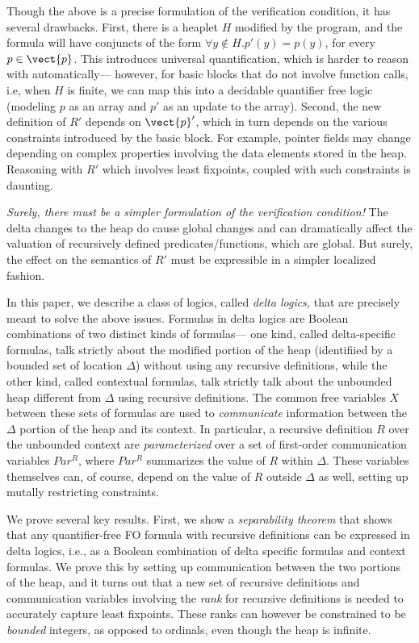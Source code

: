 Though the above is a precise formulation of the verification condition, it has several drawbacks. First, there is a heaplet $H$
modified by the program, and the formula will have conjuncts of the form $\forall y \not \in H. p'(y)=p(y)$, for every $p \in \vect{p}$.
 This introduces
universal quantification, which is harder to reason with automatically--- however, for basic blocks that do not involve
function calls, i.e, when $H$ is finite, we can map this into a decidable quantifier free logic (modeling $p$ as an array
and $p'$ as an update to the array).
Second, the new definition of $R'$ depends on $\vect{p}'$, which in turn depends on the various constraints introduced by the basic
block. For example, pointer fields may change depending on complex properties involving the data elements stored in the heap.
Reasoning with $R'$ which involves least fixpoints, coupled with such constraints is daunting.

\emph{Surely, there must be a simpler formulation of the verification condition!} The delta changes to the heap do cause global changes and
can dramatically affect the valuation of recursively defined predicates/functions, which are global.
But surely, the effect on the semantics of $R'$ must be expressible in a simpler localized fashion.

In this paper, we describe a class of logics, called \emph{delta logics,} that are precisely meant to solve the above issues.
Formulas in delta logics are Boolean combinations of two distinct kinds of formulas--- one kind, called delta-specific
formulas, talk strictly about the modified portion of the heap (identifiied by a bounded set of location $\Delta$) without using
any recursive definitions, while the other 
kind, called contextual formulas, talk strictly talk about the unbounded heap different from $\Delta$ using recursive definitions.
The common free variables $X$ between these sets of formulas are used to \emph{communicate} information between the $\Delta$
portion of the heap and its context. In particular, a recursive definition $R$ over the unbounded context are \emph{parameterized}
over a set of first-order communication variables $Par^R$, where $Par^R$ summarizes the value of $R$ within $\Delta$.
These variables themselves can, of course, depend on the value of $R$ outside $\Delta$ as well, setting up mutally restricting
constraints. 

We prove several key results. First, we show a \emph{separability theorem} that shows that any quantifier-free FO formula
with recursive definitions can be expressed in delta logics, i.e., as a Boolean combination of delta specific formulas
and context formulas. We prove this by setting up communication between the two portions of the heap, and it turns out that
a new set of recursive definitions and communication variables involving the \emph{rank} for recursive definitions is
needed to accurately capture least fixpoints. These ranks can however be constrained to be \emph{bounded} integers,
as opposed to ordinals, even though the heap is infinite. 

